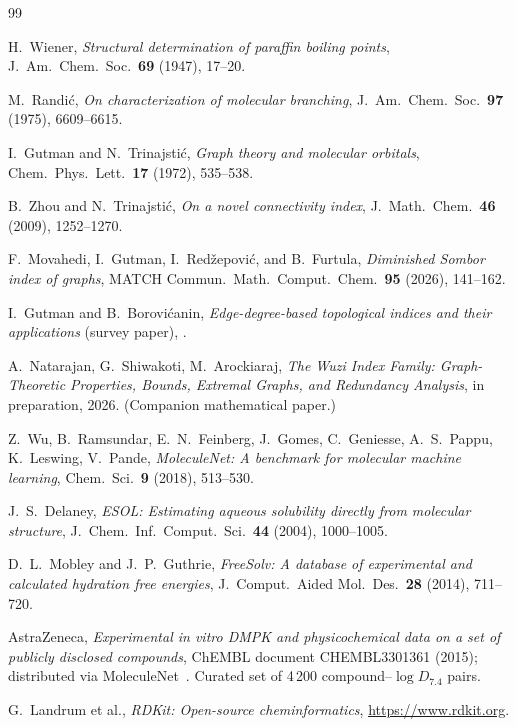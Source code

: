 \documentclass[11pt,a4paper]{article}
\theoremstyle{definition}
\newcommand{\todo}[1]{}
\begin{document}
\begin{thebibliography}{99}
\small

H.~Wiener,
\emph{Structural determination of paraffin boiling points},
J.~Am.~Chem.~Soc.~\textbf{69} (1947), 17--20.

M.~Randi\'c,
\emph{On characterization of molecular branching},
J.~Am.~Chem.~Soc.~\textbf{97} (1975), 6609--6615.

I.~Gutman and N.~Trinajsti\'c,
\emph{Graph theory and molecular orbitals},
Chem.~Phys.~Lett.~\textbf{17} (1972), 535--538.

B.~Zhou and N.~Trinajsti\'c,
\emph{On a novel connectivity index},
J.~Math.~Chem.~\textbf{46} (2009), 1252--1270.

F.~Movahedi, I.~Gutman, I.~Red\v{z}epovi\'c, and B.~Furtula,
\emph{Diminished Sombor index of graphs},
MATCH Commun.~Math.~Comput.~Chem.~\textbf{95} (2026), 141--162.

I.~Gutman and B.~Borovi\'canin,
\emph{Edge-degree-based topological indices and their applications}
(survey paper), \todo{[FULL CITATION REFERENCE NEEDED]}.

A.~Natarajan, G.~Shiwakoti, M.~Arockiaraj,
\emph{The Wuzi Index Family: Graph-Theoretic Properties, Bounds, Extremal Graphs, and Redundancy Analysis},
in preparation, 2026.
(Companion mathematical paper.)

Z.~Wu, B.~Ramsundar, E.~N.~Feinberg, J.~Gomes, C.~Geniesse,
A.~S.~Pappu, K.~Leswing, V.~Pande,
\emph{MoleculeNet: A benchmark for molecular machine learning},
Chem.~Sci.~\textbf{9} (2018), 513--530.

J.~S.~Delaney,
\emph{ESOL: Estimating aqueous solubility directly from molecular structure},
J.~Chem.~Inf.~Comput.~Sci.~\textbf{44} (2004), 1000--1005.

D.~L.~Mobley and J.~P.~Guthrie,
\emph{FreeSolv: A database of experimental and calculated hydration free energies},
J.~Comput.~Aided Mol.~Des.~\textbf{28} (2014), 711--720.

AstraZeneca, \emph{Experimental in vitro DMPK and physicochemical data
on a set of publicly disclosed compounds},
ChEMBL document CHEMBL3301361 (2015);
distributed via MoleculeNet~\cite{MoleculeNet}. Curated set of
4\,200 compound--$\log D_{7.4}$ pairs.

G.~Landrum et al.,
\emph{RDKit: Open-source cheminformatics},
\url{https://www.rdkit.org}.

\end{thebibliography}
\end{document}
